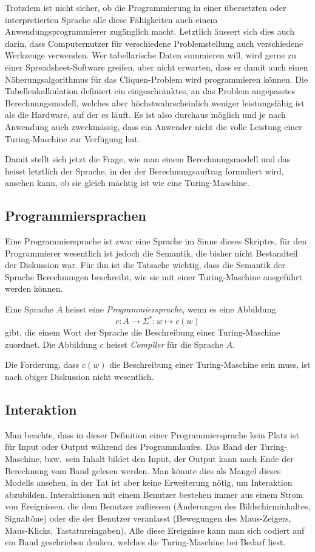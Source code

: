 Trotzdem ist nicht sicher, ob die Programmierung in einer übersetzten
oder interpretierten Sprache alle diese Fähigkeiten auch einem
Anwendungsprogrammierer zugänglich macht.
Letztlich äussert sich dies auch darin, dass Computernutzer
für verschiedene Problemstellung auch verschiedene Werkzeuge
verwenden. Wer tabellarische Daten summieren will, wird gerne
zu einer Spreadsheet-Software greifen, aber nicht erwarten, dass er
damit auch einen Näherungsalgorithmus für das Cliquen-Problem wird
programmieren können. Die Tabellenkalkulation definiert ein eingeschränktes,
an das Problem angepasstes Berechnungsmodell, welches aber
höchstwahrscheinlich weniger leistungsfähig ist als die Hardware, auf
der es läuft. Es ist also durchaus möglich und je nach Anwendung auch
zweckmässig, dass ein Anwender nicht die volle Leistung einer
Turing-Maschine zur Verfügung hat.

Damit stellt sich jetzt die Frage, wie man einem Berechnungsmodell und
das heisst letztlich der Sprache, in der der Berechnungsauftrag
formuliert wird, ansehen kann, ob sie gleich mächtig ist wie eine
Turing-Maschine.

\subsection{Programmiersprachen}
Eine Programmiersprache ist zwar eine Sprache im Sinne dieses Skriptes,
für den Programmierer wesentlich ist jedoch die Semantik, die bisher
nicht Bestandteil der Diskussion war. Für ihn ist die Tatsache wichtig,
dass die Semantik der Sprache Berechnungen beschreibt,
wie sie mit einer Turing-Maschine ausgeführt werden können.

\begin{definition}
%
Eine Sprache $A$ heisst eine {\em Programmiersprache}, wenn es eine Abbildung
\[
c\colon A\to \Sigma^*\colon w\mapsto c(w)
\]
gibt, die einem Wort der Sprache die Beschreibung einer Turing-Maschine
zuordnet. Die Abbildung $c$ heisst {\em Compiler} für die Sprache $A$.
\end{definition}
Die Forderung, dass $c(w)$ die Beschreibung einer Turing-Maschine
sein muss, ist nach obiger Diskussion nicht wesentlich.

\subsection{Interaktion}
Man beachte, dass in dieser Definition einer Programmiersprache kein Platz ist
für Input oder Output während des Programmlaufes.
Das Band der Turing-Maschine, bzw.~sein Inhalt bildet den Input, der Output
kann nach Ende der Berechnung vom Band gelesen werden.
Man könnte dies als Mangel dieses Modells ansehen, in der Tat ist aber
keine Erweiterung nötig, um Interaktion abzubilden.
Interaktionen mit einem Benutzer bestehen immer aus einem Strom von
Ereignissen, die dem Benutzer zufliessen (Änderungen des Bildschirminhaltes,
Signaltöne) oder die der Benutzer veranlasst (Bewegungen des Maus-Zeigers,
Maus-Klicks, Tastatureingaben). Alle diese Ereignisse kann man sich codiert
auf ein Band geschrieben denken, welches die Turing-Maschine bei Bedarf
liest.

